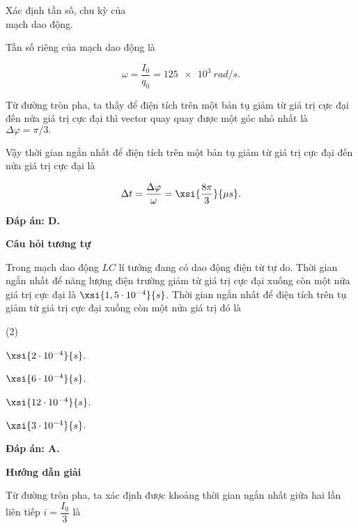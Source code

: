 \begin{dang}{Xác định tần số, chu kỳ của\\ mạch dao động.}
{	Tần số riêng của mạch dao động là 
	
	$$\omega = \dfrac{I_0}{q_0} = \SI{125 e3}{rad/s}.$$ 
	
	Từ đường tròn pha, ta thấy để điện tích trên một bản tụ giảm từ giá trị cực đại đến nửa giá trị cực đại thì vector quay quay được một góc nhỏ nhất là $\Delta \varphi = \pi /3.$ 
	
	Vậy thời gian ngắn nhất để điện tích trên một bản tụ giảm từ giá trị cực đại đến nửa giá trị cực đại là
	
	$$\Delta t = \dfrac{\Delta \varphi}{\omega}  = \xsi{\dfrac{8\pi}{3}}{\mu s}.$$
	
	\textbf{Đáp án: D.}
	\begin{center}
		\textbf{Câu hỏi tương tự}
	\end{center}
	
	Trong mạch dao động $LC$ lí tưởng đang có dao động điện từ tự do. Thời gian ngắn nhất để năng lượng điện trường giảm từ giá trị cực đại xuống còn một nửa giá trị cực đại là $\xsi{1,5\cdot10^{-4}}{s}$. Thời gian ngắn nhất để điện tích trên tụ giảm từ giá trị cực đại xuống còn một nửa giá trị đó là
	\begin{mcq}(2)
		\item $\xsi{2\cdot10^{-4}}{s}$. 
		\item $\xsi{6\cdot10^{-4}}{s}$. 
		\item $\xsi{12\cdot10^{-4}}{s}$. 
		\item $\xsi{3\cdot10^{-4}}{s}$. 
	\end{mcq}
	
	\textbf{Đáp án: A.} 
}
	{	\begin{center}
			\textbf{Hướng dẫn giải}
		\end{center}
		
		Từ đường tròn pha, ta xác định được khoảng thời gian ngắn nhất giữa hai lần liên tiếp $i =\dfrac{I_0}{3}$ là
		
}
\end{dang}

